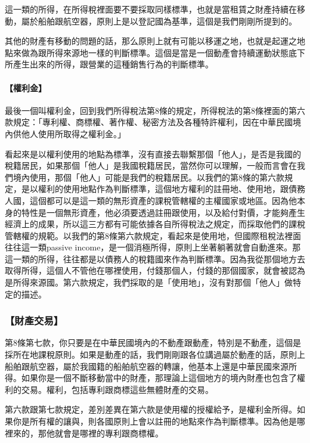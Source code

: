 \documentclass[oneside,sub3section]{ctexbook}
\let\oldparagraph\paragraph
\renewcommand{\paragraph}[1]{\oldparagraph{#1}\mbox{}}
\begin{document}
這一類的所得，在所得稅裡面要不要採取同樣標準，也就是當租賃之財產持續在移動，屬於船舶跟航空器，原則上是以登記國為基準，這個是我們剛剛所提到的。

其他的財產有移動的問題的話，那么原則上就有可能以移運之地，也就是起運之地點來做為跟所得來源地一樣的判斷標準。這個是當是一個動產會持續運動狀態底下所產生出來的所得，跟營業的這種銷售行為的判斷標準。

\hypertarget{ux6b0aux5229ux91d1}{%
\paragraph{【權利金】}\label{ux6b0aux5229ux91d1}}

最後一個叫權利金，回到我們所得稅法第8條的規定，所得稅法的第8條裡面的第六款規定：「專利權、商標權、著作權、秘密方法及各種特許權利，因在中華民國境內供他人使用所取得之權利金。」

看起來是以權利使用的地點為標準，沒有直接去聯繫那個「他人」，是否是我國的稅籍居民，如果那個「他人」是我國稅籍居民，當然你可以理解，一般而言會在我們境內使用，那個「他人」可能是我們的稅籍居民。以我們的第8條的第六款規定，是以權利的使用地點作為判斷標準，這個地方權利的註冊地、使用地，跟債務人國，這個都可以是這一類的無形資產的課稅管轄權的主權國家或地區。因為他本身的特性是一個無形資產，他必須要透過註冊跟使用，以及給付對價，才能夠產生經濟上的成果，所以這三方都有可能依據各自所得稅法之規定，而採取他們的課稅管轄權的規範。以我們的第8條第六款規定，看起來是使用地，但國際租稅法裡面往往這一類passive income，是一個消極所得，原則上坐著躺著就會自動進來。那這一類的所得，往往都是以債務人的稅籍國來作為判斷標準。因為我從那個地方去取得所得，這個人不管他在哪裡使用，付錢那個人，付錢的那個國家，就會被認為是所得來源國。第六款規定，我們採取的是「使用地」，沒有對那個「他人」做特定的描述。

\hypertarget{ux8ca1ux7522ux4ea4ux6613}{%
\subsubsection{【財產交易】}\label{ux8ca1ux7522ux4ea4ux6613}}

第8條第七款，你只要是在中華民國境內的不動產跟動產，特別是不動產，這個是採所在地課稅原則。如果是動產的話，我們剛剛跟各位講過屬於動產的話，原則上船舶跟航空器，屬於我國籍的船舶航空器的轉讓，他基本上還是中華民國來源所得。如果你是一個不斷移動當中的財產，那理論上這個地方的境內財產也包含了權利的交易。權利，包括專利跟商標這些無體財產的交易。

第六款跟第七款規定，差別差異在第六款是使用權的授權給予，是權利金所得。如果你是所有權的讓與，則各國原則上會以註冊的地點來作為判斷標準。因為他是哪裡來的，那他就會是哪裡的專利跟商標權。
\end{document}
